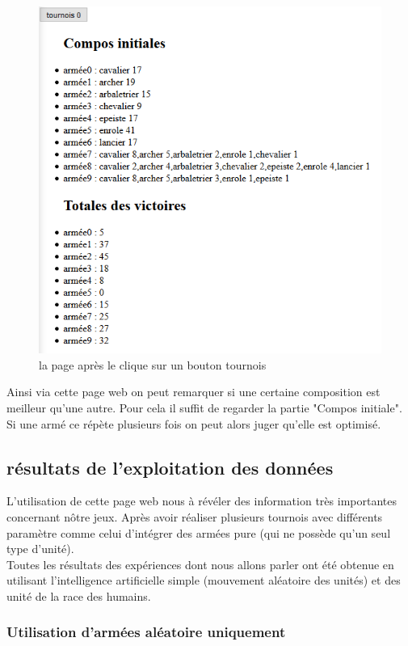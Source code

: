 \documentclass{article}
\begin{document}
		\begin{figure}[h]
			\center
			\includegraphics[scale=.7]{../webimg/but.png}
			\caption{la page après le clique sur un bouton tournois} 
		\end{figure}
		
		Ainsi via cette page web on peut remarquer si une certaine composition est meilleur qu'une autre. Pour cela il suffit de regarder la partie "Compos initiale". Si une armé ce répète plusieurs fois on peut alors juger qu'elle est optimisé.

\newpage
\subsection{résultats de l'exploitation des données}
	
	L'utilisation de cette page web nous à révéler des information très importantes concernant nôtre jeux. Après avoir réaliser plusieurs tournois avec différents paramètre comme celui d'intégrer des armées pure (qui ne possède qu'un seul type d'unité).\\
	Toutes les résultats des expériences dont nous allons parler ont été obtenue en utilisant l'intelligence artificielle simple (mouvement aléatoire des unités) et des unité de la race des humains.
	
	\subsubsection{Utilisation d'armées aléatoire uniquement}
	
\end{document}
